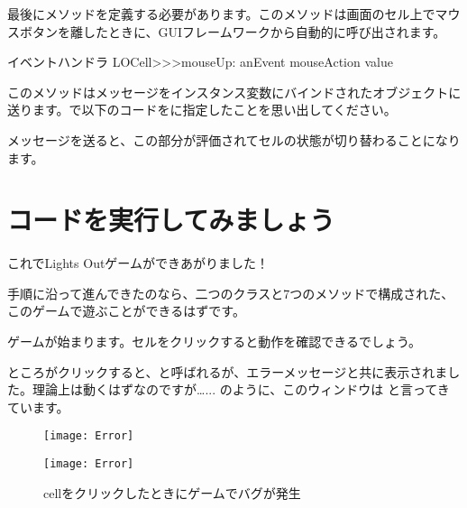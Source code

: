 \documentclass[a4paper,10pt,twoside]{book}
\begin{document}

最後にメソッドを定義する必要があります。このメソッドは画面のセル上でマウスボタンを離したときに、GUIフレームワークから自動的に呼び出されます。

\begin{method}[sbecellmouseup]{イベントハンドラ}
LOCell>>>mouseUp: anEvent
   mouseAction value
\end{method}



このメソッドはメッセージをインスタンス変数にバインドされたオブジェクトに送ります。で以下のコードをに指定したことを思い出してください。


\noindent
{}メッセージを送ると、この部分が評価されてセルの状態が切り替わることになります。

\section{コードを実行してみましょう}

これでLights Outゲームができあがりました！

手順に沿って進んできたのなら、二つのクラスと7つのメソッドで構成された、このゲームで遊ぶことができるはずです。


ゲームが始まります。セルをクリックすると動作を確認できるでしょう。

ところがクリックすると、と呼ばれるが、エラーメッセージと共に表示されました。理論上は動くはずなのですが\ldots{}... のように、このウィンドウは と言ってきています。

\begin{figure}[ht]
\ifluluelse
	{\centerline{\texttt{[image: Error]}}}
	{\centerline{\texttt{[image: Error]}}}
\caption{cellをクリックしたときにゲームでバグが発生
}
\end{figure}
\end{document}

